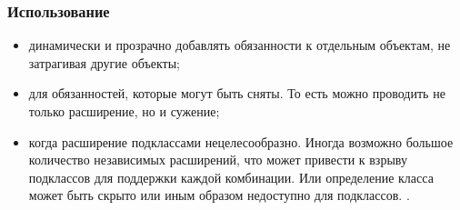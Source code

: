 \documentclass[10pt]{article}
\begin{document}
\subsubsection{Использование}
\begin{itemize}
	\item динамически и прозрачно добавлять обязанности к отдельным объектам, не затрагивая другие объекты;
	\item для обязанностей, которые могут быть сняты. То есть можно проводить не только расширение, но и сужение;
	\item когда расширение подклассами нецелесообразно.
	Иногда возможно большое количество независимых расширений, что может привести к взрыву подклассов для поддержки каждой комбинации.
	Или определение класса может быть скрыто или иным образом недоступно для подклассов.
		. 
\end{itemize}
\end{document}
